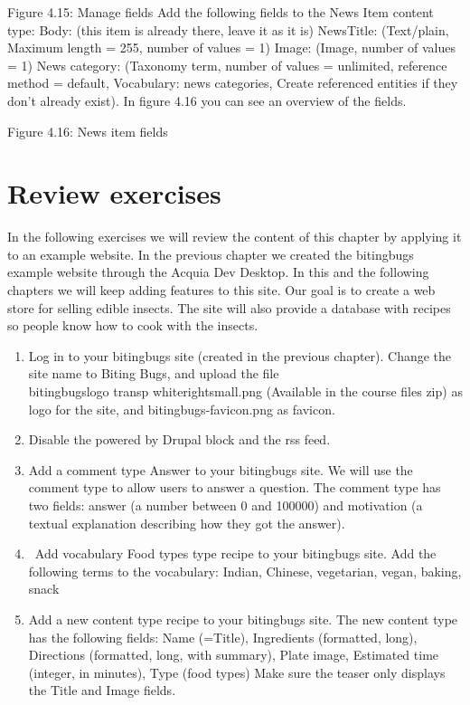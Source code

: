 Figure 4.15: Manage fields
Add the following fields to the News Item content type: 
Body: (this item is already there, leave it as it is)
NewsTitle: (Text/plain, Maximum length = 255, number of values = 1) 
Image: (Image, number of values = 1)
News category: (Taxonomy term, number of values = unlimited, reference method = default, Vocabulary: news categories, Create referenced entities if they don’t already exist).
In figure 4.16 you can see an overview of the fields.

Figure 4.16: News item fields
\section{Review exercises}
In the following exercises we will review the content of this chapter by applying it to an example website. In the previous chapter we created the bitingbugs example website through the Acquia Dev Desktop. In this and the following chapters we will keep adding features to this site. Our goal is to create a web store for selling edible insects. The site will also provide a database with recipes so people know how to cook with the insects.

\begin{enumerate}
    \item Log in to your bitingbugs site (created in the previous chapter). Change the site name to Biting Bugs, and upload the file \\ bitingbugs\textunderscore \textunderscore logo \textunderscore transp \textunderscore white\textunderscore right\textunderscore small.png (Available in the course files zip) as logo for the site, and bitingbugs-favicon.png as favicon.
    \item Disable the powered by Drupal block and the rss feed.
    \item Add a comment type Answer to your bitingbugs site. We will use the comment type to allow users to answer a question. The comment type has two fields: answer (a number between 0 and 100000) and motivation (a textual explanation describing how they got the answer).
    \item\ Add vocabulary Food types type recipe to your bitingbugs site. Add the following terms to the vocabulary: Indian, Chinese, vegetarian, vegan, baking, snack
    \item Add a new content type recipe to your bitingbugs site. The new content type has the following fields: Name (=Title), Ingredients (formatted, long), Directions (formatted, long, with summary), Plate image, Estimated time (integer, in minutes), Type (food types)
    Make sure the teaser only displays the Title and Image fields.
\end{enumerate}
